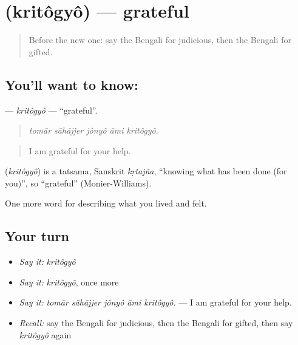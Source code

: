 \section[\texorpdfstring{\bn{কৃতজ্ঞ} (kritôgyô)}{কৃতজ্ঞ (kritôgyô)}]{ (kritôgyô) — grateful}

\label{lesson:BN-C465-kritogyo}



\begin{quote}
Before the new one: say the Bengali for judicious, then the Bengali for gifted.
\end{quote}

\subsection*{You'll want to know: }
\textbf{} — \emph{kritôgyô} — \textquotedblleft{}grateful\textquotedblright{}.

\begin{quote}
    
\end{quote}

\begin{quote}
\emph{tomār sāhājjer jônyô āmi kritôgyô.}
\end{quote}

\begin{quote}
I am grateful for your help.
\end{quote}

\begin{cousinweb}
\textbf{} (\emph{kritôgyô}) is a tatsama, Sanskrit \emph{kṛtajña}, \textquotedblleft{}knowing what has been done (for you)\textquotedblright{}, so \textquotedblleft{}grateful\textquotedblright{} (Monier-Williams).
\end{cousinweb}

\begin{grammarlens}[title={What you've built}]
One more word for describing what you lived and felt.
\end{grammarlens}

\subsection*{Your turn}
\begin{itemize}
\raggedright
  \item \emph{Say it:} \emph{kritôgyô}
  \item \emph{Say it:} \emph{kritôgyô}, once more
  \item \emph{Say it:} \emph{tomār sāhājjer jônyô āmi kritôgyô.} — I am grateful for your help.
  \item \emph{Recall:} say the Bengali for judicious, then the Bengali for gifted, then say \emph{kritôgyô} again
\end{itemize}

